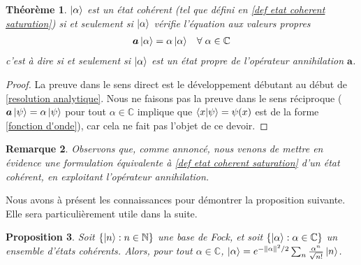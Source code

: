 \documentclass[11pt,oneside,a4paper]{article}
\newtheorem{theorem}{Théorème}[section]
\newtheorem{property}[theorem]{Proposition}
\newtheorem{remark}[theorem]{Remarque}
\begin{document}
\begin{theorem}
  $\ket{\alpha}$ est un état cohérent (tel que défini en \ref{def etat coherent saturation}) si et seulement si $\ket{\alpha}$ vérifie l'équation aux valeurs propres
  \begin{align}
    \label{etat coherent}
    \bm{a}\ket{\alpha} &= \alpha\ket{\alpha} &\forall\; \alpha\in\mathbb{C}
  \end{align}
  c'est à dire si et seulement si $\ket{\alpha}$ est un état propre de l'opérateur annihilation $\bm{a}$.
\end{theorem}

\begin{proof}
  La preuve dans le sens direct est le développement débutant au début de \ref{resolution analytique}. Nous ne faisons pas la preuve dans le sens réciproque ($\bm{a}\ket{\psi}=\alpha\ket{\psi}$ pour tout $\alpha\in\mathbb{C}$ implique que $\braket{x}{\psi}=\psi(x)$ est de la forme \ref{fonction d'onde}), car cela ne fait pas l'objet de ce devoir.
\end{proof}

\begin{remark}
  Observons que, comme annoncé, nous venons de mettre en évidence une formulation équivalente à \ref{def etat coherent saturation} d'un état cohérent, en exploitant l'opérateur annihilation.
\end{remark}

Nous avons à présent les connaissances pour démontrer la proposition suivante. Elle sera particulièrement utile dans la suite.

\begin{property}
  \label{coherent in fock}
  Soit $\left\{\ket{n} : n\in\mathbb{N}\right\}$ une base de Fock, et soit $\left\{\ket{\alpha} : \alpha\in\mathbb{C}\right\}$ un ensemble d'états cohérents. Alors, pour tout $\alpha\in\mathbb{C}$, $\ket{\alpha} = e^{-\norm{\alpha}^2/2}\sum_n \frac{\alpha^n}{\sqrt{n!}}\ket{n}$.
\end{property}
\end{document}
